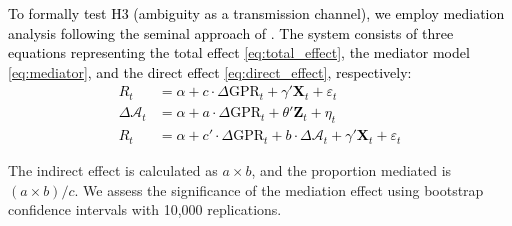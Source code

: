 \documentclass[preprint,12pt,authoryear]{elsarticle}
\begin{document}
\textcolor{black}{
To formally test H3 (ambiguity as a transmission channel), we employ mediation analysis following the seminal approach of \citet{Baron1986Moderator}. The system consists of three equations representing the total effect \eqref{eq:total_effect}, the mediator model \eqref{eq:mediator}, and the direct effect \eqref{eq:direct_effect}, respectively:
\begin{align}
    R_{t} &= \alpha + c \cdot \Delta \text{GPR}_{t} + \gamma' \mathbf{X}_{t} + \varepsilon_{t} \label{eq:total_effect} \\
    \Delta \mathcal{A}_{t} &= \alpha + a \cdot \Delta \text{GPR}_{t} + \theta' \mathbf{Z}_{t} + \eta_{t} \label{eq:mediator} \\
    R_{t} &= \alpha + c' \cdot \Delta \text{GPR}_{t} + b \cdot \Delta \mathcal{A}_{t} + \gamma' \mathbf{X}_{t} + \varepsilon_{t} \label{eq:direct_effect}
\end{align}
}

The indirect effect is calculated as $a \times b$, and the proportion mediated is $(a \times b) / c$. We assess the significance of the mediation effect using bootstrap confidence intervals with 10,000 replications.
\end{document}
